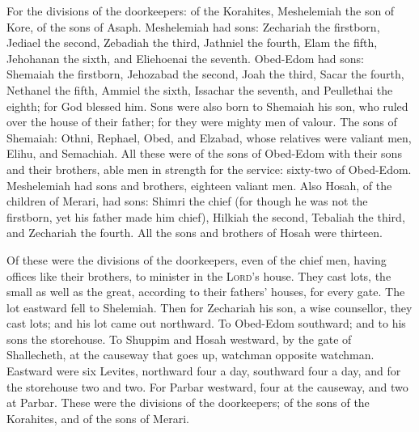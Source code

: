  For the divisions of the doorkeepers: of the Korahites,
Meshelemiah the son of Kore, of the sons of Asaph. 
Meshelemiah had sons: Zechariah the firstborn, Jediael the second,
Zebadiah the third, Jathniel the fourth,  Elam the fifth,
Jehohanan the sixth, and Eliehoenai the seventh. 
Obed-Edom had sons: Shemaiah the firstborn, Jehozabad the second, Joah
the third, Sacar the fourth, Nethanel the fifth,  Ammiel
the sixth, Issachar the seventh, and Peullethai the eighth; for God
blessed him.  Sons were also born to Shemaiah his son, who
ruled over the house of their father; for they were mighty men of
valour.  The sons of Shemaiah: Othni, Rephael, Obed, and
Elzabad, whose relatives were valiant men, Elihu, and Semachiah.
 All these were of the sons of Obed-Edom with their sons
and their brothers, able men in strength for the service: sixty-two of
Obed-Edom.  Meshelemiah had sons and brothers, eighteen
valiant men.  Also Hosah, of the children of Merari, had
sons: Shimri the chief (for though he was not the firstborn, yet his
father made him chief),  Hilkiah the second, Tebaliah the
third, and Zechariah the fourth. All the sons and brothers of Hosah were
thirteen.

 Of these were the divisions of the doorkeepers, even of
the chief men, having offices like their brothers, to minister in the
\textsc{Lord}'s house.  They cast lots, the small as well
as the great, according to their fathers' houses, for every gate.
 The lot eastward fell to Shelemiah. Then for Zechariah
his son, a wise counsellor, they cast lots; and his lot came out
northward.  To Obed-Edom southward; and to his sons the
storehouse.  To Shuppim and Hosah westward, by the gate
of Shallecheth, at the causeway that goes up, watchman opposite
watchman.  Eastward were six Levites, northward four a
day, southward four a day, and for the storehouse two and two.
 For Parbar westward, four at the causeway, and two at
Parbar.  These were the divisions of the doorkeepers; of
the sons of the Korahites, and of the sons of Merari.

